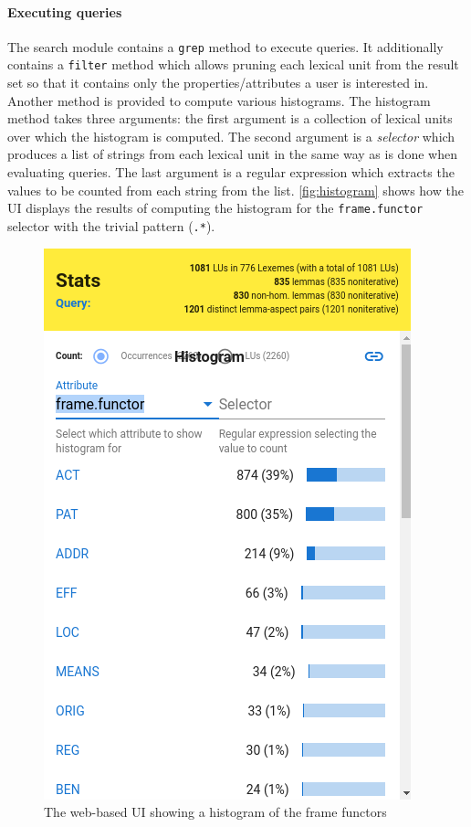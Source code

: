 \documentclass[10pt, a4paper]{article}
\newcommand{\py}[1]{{\tt #1}}
\begin{document}
\paragraph{Executing queries}
The search module contains a \py{grep} method to execute queries. It additionally contains a \py{filter}
method which allows pruning each lexical unit from the result set so that it contains only the properties/attributes a user is interested in. Another method is provided to compute various histograms.
The histogram method takes three arguments: the first argument is a collection of lexical units over which the histogram is computed. The second argument is a \emph{selector} which produces a list of strings
from each lexical unit in the same way as is done when evaluating queries. The last argument is a
regular expression which extracts the values to be counted from each string from the list. \autoref{fig:histogram}
shows how the UI displays the results of computing the histogram for the {\tt frame.functor} selector with
the trivial pattern ({\tt .*}).
\begin{figure}
    \includegraphics[width=\hsize]{images/histogram.png}
    \caption{\label{fig:histogram}The web-based UI showing a histogram of the frame functors}
\end{figure}
\end{document}

